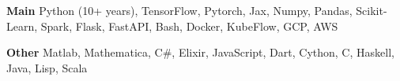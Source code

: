 \textbf{Main}
Python (10+ years), TensorFlow, Pytorch, Jax, Numpy, Pandas, Scikit-Learn, Spark, Flask, FastAPI, Bash, Docker, KubeFlow, GCP, AWS

\textbf{Other}
Matlab, Mathematica, C\#, Elixir, JavaScript, Dart, Cython, C, Haskell, Java, Lisp, Scala